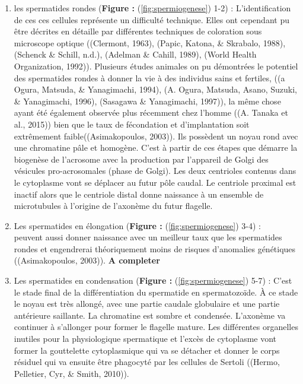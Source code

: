\documentclass[12pt,twoside]{reedthesis}
\providecommand{\tightlist}{%
  \setlength{\itemsep}{0pt}\setlength{\parskip}{0pt}}
\theoremstyle{definition}
\theoremstyle{definition}
\theoremstyle{remark}
\begin{document}
  \begin{enumerate}
  \def\labelenumi{\arabic{enumi}.}
  \tightlist
  \item
    les spermatides rondes (\textbf{Figure : }(\ref{fig:spermiogenese})
    1-2) : L'identification de ces ces cellules représente un difficulté
    technique. Elles ont cependant pu être décrites en détaille par
    différentes techniques de coloration sous microscope optique
    ((Clermont, 1963), (Papic, Katona, \& Skrabalo, 1988), (Schenck \&
    Schill, n.d.), (Adelman \& Cahill, 1989), (World Health Organization,
    1992)). Plusieurs études animales on pu démontrées le potentiel des
    spermatides rondes à donner la vie à des individus sains et fertiles,
    ((a Ogura, Matsuda, \& Yanagimachi, 1994), (A. Ogura, Matsuda, Asano,
    Suzuki, \& Yanagimachi, 1996), (Sasagawa \& Yanagimachi, 1997)), la
    même chose ayant été également observée plus récemment chez l'homme
    ((A. Tanaka et al., 2015)) bien que le taux de fécondation et
    d'implantation soit extrêmement faible((Asimakopoulos, 2003)). Ils
    possèdent un noyau rond avec une chromatine pâle et homogène. C'est à
    partir de ces étapes que démarre la biogenèse de l'acrosome avec la
    production par l'appareil de Golgi des vésicules pro-acrosomales
    (phase de Golgi). Les deux centrioles contenus dans le cytoplasme vont
    se déplacer au futur pôle caudal. Le centriole proximal est inactif
    alors que le centriole distal donne naissance à un ensemble de
    microtubules à l'origine de l'axonème du futur flagelle.\\
  \item
    Les spermatides en élongation (\textbf{Figure :
    }(\ref{fig:spermiogenese}) 3-4) :\\
    peuvent aussi donner naissance avec un meilleur taux que les
    spermatides rondes et engendrerai théoriquement moins de risques
    d'anomalies génétiques ((Asimakopoulos, 2003)). \textbf{A completer}\\
  \item
    Les spermatides en condensation (\textbf{Figure :
    }(\ref{fig:spermiogenese}) 5-7) : C'est le stade final de la
    différentiation du spermatide en spermatozoïde. À ce stade le noyau
    est très allongé, avec une partie caudale globulaire et une partie
    antérieure saillante. La chromatine est sombre et condensée. L'axonème
    va continuer à s'allonger pour former le flagelle mature. Les
    différentes organelles inutiles pour la physiologique spermatique et
    l'excès de cytoplasme vont former la gouttelette cytoplasmique qui va
    se détacher et donner le corps résiduel qui va ensuite être phagocyté
    par les cellules de Sertoli ((Hermo, Pelletier, Cyr, \& Smith, 2010)).
  \end{enumerate}
  
\end{document}
